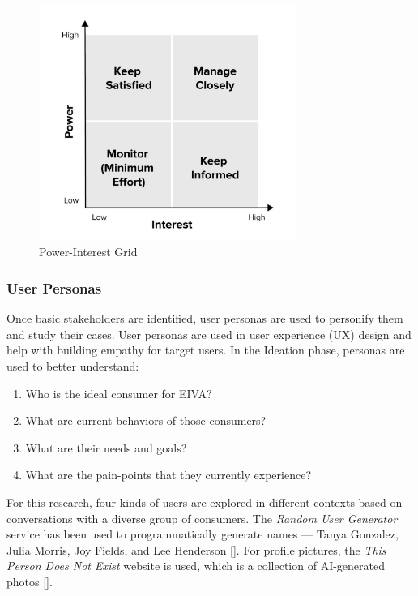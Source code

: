 \documentclass{article}
\begin{document}
\begin{figure}
	\centering
	\includegraphics[width=0.75\textwidth]{power-interest.jpg}
	\caption{Power-Interest Grid}
	\label{fig:checkbox}
\end{figure}

\subsubsection{User Personas}

Once basic stakeholders are identified, user personas are used to personify them and study their cases. User personas are used in user experience (UX) design and help with building empathy for target users. In the Ideation phase, personas are used to better understand:

\begin{enumerate}
	\item Who is the ideal consumer for EIVA?
	\item What are current behaviors of those consumers?
	\item What are their needs and goals?
	\item What are the pain-points that they currently experience?
\end{enumerate}

For this research, four kinds of users are explored in different contexts based on conversations with a diverse group of consumers. The \emph{Random User Generator} service has been used to programmatically generate names --- Tanya Gonzalez, Julia Morris, Joy Fields, and Lee Henderson []. For profile pictures, the \emph{This Person Does Not Exist} website is used, which is a collection of AI-generated photos [].
\end{document}
